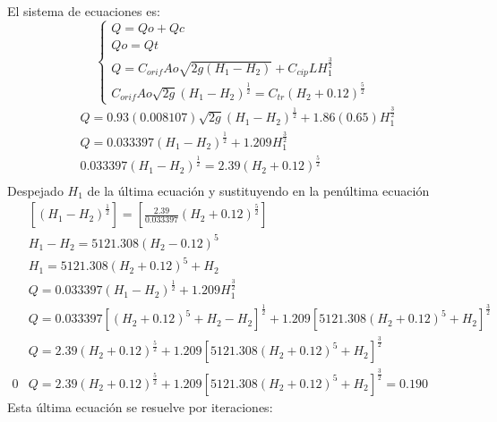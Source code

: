     El sistema de ecuaciones es:
    \begin{equation*}
        \begin{cases} 
            Q = Qo + Qc\\
            Qo = Qt\\
            Q = C_{orif}Ao \sqrt{2g\left(H_1 - H_2\right)} + C_{cip}LH_1^{\frac{3}{2}}\\
            C_{orif}Ao \sqrt{2g}\left(H_1 - H_2\right)^{\frac{1}{2}} = C_{tr}\left(H_2 + 0.12\right)^{\frac{5}{2}}
        \end{cases} 
    \end{equation*}
    \begin{align*}
        &Q = 0.93(0.008107)\sqrt{2g}\left(H_1 - H_2\right)^{\frac{1}{2}} + 1.86(0.65)H_1^{\frac{3}{2}}\\
        &Q = 0.033397\left(H_1 - H_2\right)^{\frac{1}{2}} + 1.209H_1^{\frac{3}{2}}\\
        &0.033397\left(H_1 - H_2\right)^{\frac{1}{2}} = 2.39\left(H_2 + 0.12\right)^{\frac{5}{2}}\\
    \end{align*}
    Despejado $H_1$ de la última ecuación y sustituyendo en la penúltima ecuación
\begin{align*}
    &\left[\left(H_1 - H_2\right)^{\frac{1}{2}}\right] =\left[\frac{2.39}{0.033397}\left(H_2 + 0.12\right)^{\frac{5}{2}}\right]\\
    &H_1 - H_2 = 5121.308\left(H_2 - 0.12\right)^5\\
    &H_1 = 5121.308\left(H_2 +0.12 \right)^5 + H_2\\
    &Q = 0.033397\left(H_1 - H_2\right)^{\frac{1}{2}} + 1.209 H_1^{\frac{3}{2}}\\
    &Q = 0.033397\left[\left(H_2 + 0.12\right)^{5}+ H_2 - H_2\right]^{\frac{1}{2}} + 1.209\left[5121.308\left(H_2 + 0.12\right)^{5} + H_2\right]^{\frac{3}{2}}\\
    &Q = 2.39\left(H_2 +0.12\right)^{\frac{5}{2}} + 1.209\left[5121.308\left(H_2 + 0.12\right)^{5} + H_2\right]^{\frac{3}{2}}\\0
    &Q = 2.39\left(H_2 + 0.12\right)^{\frac{5}{2}} + 1.209\left[5121.308\left(H_2 + 0.12\right)^5 + H_2\right]^{\frac{3}{2}} = 0.190
\end{align*}
Esta última ecuación se resuelve por iteraciones:

